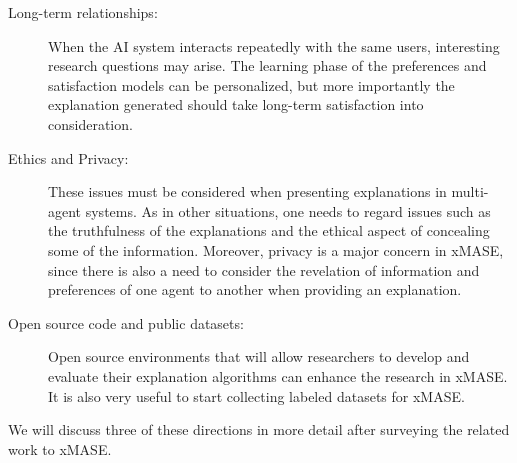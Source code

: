 \documentclass[letterpaper]{article} %
\begin{document}
\begin{description}
\item[ Long-term relationships:] When the AI system interacts repeatedly with the same users, interesting research questions may arise. The learning phase of the preferences and satisfaction models can be personalized, but more importantly the explanation generated should take long-term satisfaction into consideration. 
\item[Ethics and Privacy:] These issues must be considered when presenting explanations in multi-agent systems. As in other situations, one needs to regard issues such as the truthfulness of the explanations and the ethical aspect of concealing some of the information. Moreover, privacy is a major concern in \ac{xMASE}, since there is also a need to consider the revelation of information and preferences of one agent to another when providing an explanation.
\item[Open source code and public datasets:] Open source environments that will allow researchers to develop and evaluate their explanation algorithms can enhance the research in \ac{xMASE}. It is also very useful to start collecting labeled datasets for \ac{xMASE}. 
\end{description}
We will discuss three of these  directions in more detail after surveying the related work to \ac{xMASE}.


   
    
\end{document}
